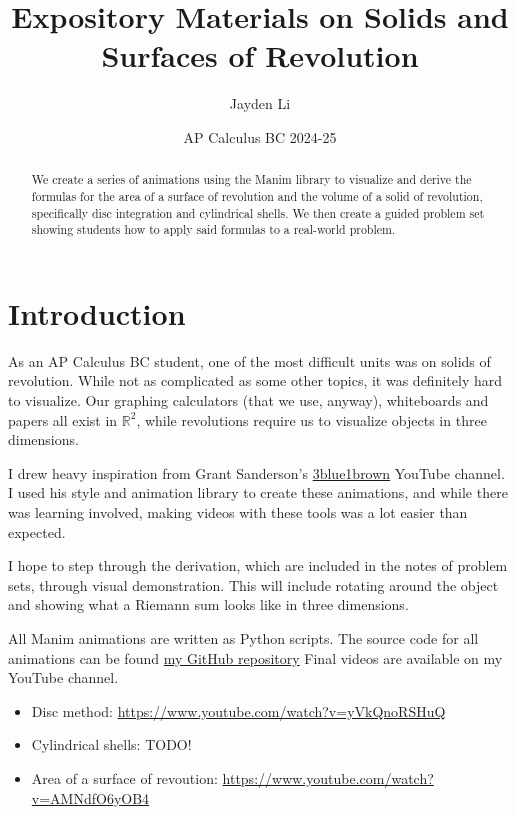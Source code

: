 \documentclass{article}
\title{\vspace*{-40pt} Expository Materials on Solids and Surfaces of Revolution}
\author{Jayden Li}
\date{AP Calculus BC 2024-25}
\begin{document}
\fontsize{11pt}{12pt}\selectfont
\setlength{\abovedisplayskip}{\abovedisplayskip/2}
\setlength{\belowdisplayskip}{\belowdisplayskip/2}
\setlength{\parindent}{0pt}
\setlength{\parskip}{2ex plus 0.5ex minus 0.2ex}
\maketitle

\begin{abstract}
	We create a series of animations using the Manim library to visualize and derive the formulas for the area of a surface of revolution and the volume of a solid of revolution, specifically disc integration and cylindrical shells. We then create a guided problem set showing students how to apply said formulas to a real-world problem.
\end{abstract}

\section{Introduction}

As an AP Calculus BC student, one of the most difficult units was on solids of revolution. While not as complicated as some other topics, it was definitely hard to visualize. Our graphing calculators (that we use, anyway), whiteboards and papers all exist in $\mathbb R^2$, while revolutions require us to visualize objects in three dimensions.

I drew heavy inspiration from Grant Sanderson's \href{https://www.youtube.com/c/3blue1brown}{3blue1brown} YouTube channel. I used his style and animation library to create these animations, and while there was learning involved, making videos with these tools was a lot easier than expected.

I hope to step through the derivation, which are included in the notes of problem sets, through visual demonstration. This will include rotating around the object and showing what a Riemann sum looks like in three dimensions.

All Manim animations are written as Python scripts. The source code for all animations can be found \href{https://github.com/glolichen/calc-bc-project}{my GitHub repository} Final videos are available on my YouTube channel.
\begin{itemize}[topsep=0pt]
	\item Disc method: \url{https://www.youtube.com/watch?v=yVkQnoRSHuQ}
	\item Cylindrical shells: TODO!
	\item Area of a surface of revoution: \url{https://www.youtube.com/watch?v=AMNdfO6yOB4}
\end{itemize}
\end{document}
